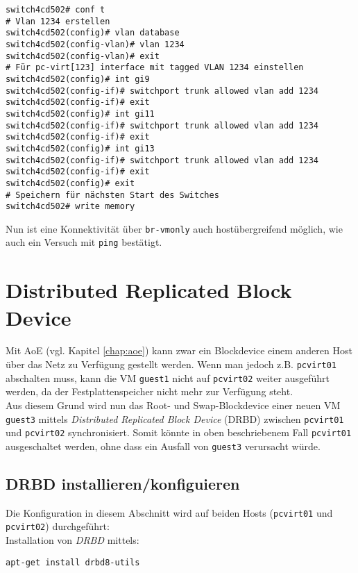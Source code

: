 \setupVerbatimOut
\begin{verbatim}
switch4cd502# conf t
# Vlan 1234 erstellen
switch4cd502(config)# vlan database 
switch4cd502(config-vlan)# vlan 1234
switch4cd502(config-vlan)# exit
# Für pc-virt[123] interface mit tagged VLAN 1234 einstellen 
switch4cd502(config)# int gi9 
switch4cd502(config-if)# switchport trunk allowed vlan add 1234
switch4cd502(config-if)# exit
switch4cd502(config)# int gi11
switch4cd502(config-if)# switchport trunk allowed vlan add 1234
switch4cd502(config-if)# exit
switch4cd502(config)# int gi13
switch4cd502(config-if)# switchport trunk allowed vlan add 1234
switch4cd502(config-if)# exit
switch4cd502(config)# exit
# Speichern für nächsten Start des Switches
switch4cd502# write memory
\end{verbatim}

Nun ist eine Konnektivität über \verb#br-vmonly# auch hostübergreifend möglich, wie auch ein Versuch mit \verb#ping# bestätigt.

\chapter{Distributed Replicated Block Device}

Mit AoE (vgl. Kapitel \ref{chap:aoe}) kann zwar ein Blockdevice einem anderen Host über das Netz zu Verfügung gestellt werden. Wenn man jedoch z.B. \verb#pcvirt01# abschalten muss, kann die VM \verb#guest1# nicht auf \verb#pcvirt02# weiter ausgeführt werden, da der Festplattenspeicher nicht mehr zur Verfügung steht.
\\
Aus diesem Grund wird nun das Root- und Swap-Blockdevice einer neuen VM \verb#guest3# mittels \emph{Distributed Replicated Block Device} (DRBD) zwischen \verb#pcvirt01# und \verb#pcvirt02# synchronisiert. Somit könnte in oben beschriebenem Fall \verb#pcvirt01# ausgeschaltet werden, ohne dass ein Ausfall von \verb#guest3# verursacht würde.

\section{DRBD installieren/konfiguieren}
Die Konfiguration in diesem Abschnitt wird auf beiden Hosts (\verb#pcvirt01# und \verb#pcvirt02#) durchgeführt: 
\\
Installation von \emph{DRBD} mittels: 
\setupVerbatimOut
\begin{verbatim}
apt-get install drbd8-utils
\end{verbatim}

